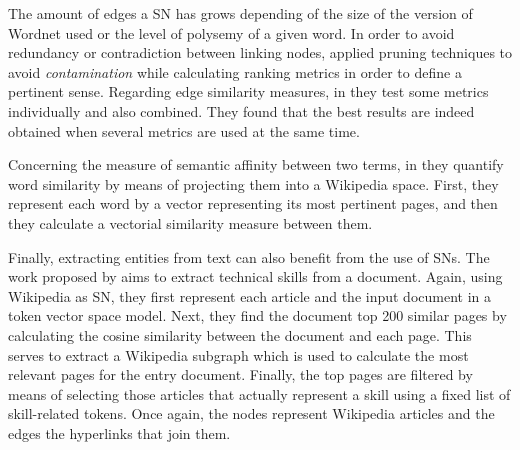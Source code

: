 The amount of edges a SN has grows depending of the size of the version of Wordnet used or the level of polysemy of a given word. In order to avoid redundancy or contradiction between  linking nodes, \cite{2004.Mihalcea.SemanticNetworkPageRank,2007.Navigli.GraphConnectivity} applied pruning techniques to avoid \textit{contamination} while calculating ranking metrics in order to define a pertinent sense. Regarding edge similarity measures,  in  \cite{2007.Sinha.Mihalcea.Unsupervised, 2007.Tsatsaronis.WSDwithSpreading} they test some metrics individually and also combined. They found that the best results are indeed obtained when several metrics are used at the same time.


Concerning the measure of semantic affinity between two terms, in \cite{2009.Yeh.Wikiwalk} they quantify word similarity by means of projecting them into a Wikipedia space. First, they represent each word by a vector representing its most pertinent pages,  and then they calculate a vectorial similarity measure between them.




Finally, extracting entities from text can also benefit from the use of SNs. The work proposed by  \cite{2013.Kivimaki.AGraph-BasedApproach} aims to extract technical skills from a document. Again, using Wikipedia as SN, they first represent each article and the input document in a token vector space model.  Next, they find the document top 200 similar pages by calculating the cosine similarity between the document and each page. This serves to extract a Wikipedia subgraph which is used to calculate the most relevant pages for the entry document. Finally, the top pages are filtered by means of selecting those articles that actually represent a skill using a fixed list of skill-related tokens. Once again, the nodes represent Wikipedia articles and the edges the hyperlinks that join them.


